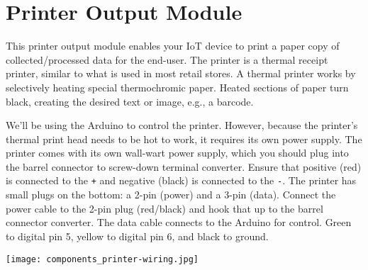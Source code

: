 
\clearpage
\section{Printer Output Module}
\label{sec-output-printer}

This printer output module enables your IoT device to print a paper copy
of collected/processed data for the end-user. The printer is a thermal
receipt printer, similar to what is used in most retail stores. A
thermal printer works by selectively heating special thermochromic
paper. Heated sections of paper turn black, creating the desired text or
image, e.g., a barcode.

We'll be using the Arduino to control the printer. However, because the
printer's thermal print head needs to be hot to work, it requires its
own power supply. The printer comes with its own wall-wart power supply,
which you should plug into the barrel connector to screw-down terminal
converter. Ensure that positive (red) is connected to the \texttt{+} and
negative (black) is connected to the \texttt{-}. The printer has small
plugs on the bottom: a 2-pin (power) and a 3-pin (data). Connect the
power cable to the 2-pin plug (red/black) and hook that up to the barrel
connector converter. The data cable connects to the Arduino for control.
Green to digital pin 5, yellow to digital pin 6, and black to ground.


\begin{center}
  \texttt{[image: components\_printer-wiring.jpg]}
\end{center}

